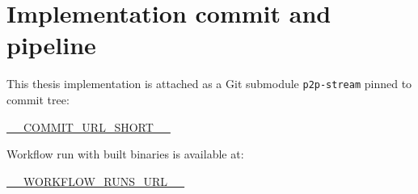 \section{Implementation commit and pipeline}
\label{sec:appendix-implementation-commit}
This thesis implementation is attached as a Git submodule \texttt{p2p-stream} pinned to commit tree:

\noindent\href{__COMMIT_URL_SHORT__}{\url{__COMMIT_URL_SHORT__}}

Workflow run with built binaries is available at:

\noindent\url{__WORKFLOW_RUNS_URL__}

